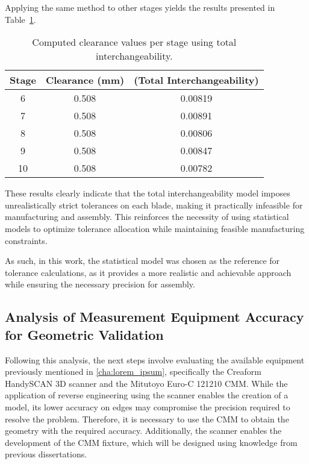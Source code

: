 Applying the same method to other stages yields the results presented in Table~\ref{tab:clearance_interchangeability}.

\begin{table}[h]
    \centering
    \begin{tabular}{@{}ccc@{}}
        \toprule
        Stage & Clearance (mm) &  \newline (Total Interchangeability) \\
        \midrule
        6  & 0.508 & 0.00819    \\
        7  & 0.508 & 0.00891    \\
        8  & 0.508 & 0.00806    \\
        9  & 0.508 & 0.00847    \\
        10 & 0.508 & 0.00782    \\
        \bottomrule
    \end{tabular}
    \caption{Computed clearance values per stage using total interchangeability.}
    \label{tab:clearance_interchangeability}
\end{table}

These results clearly indicate that the total interchangeability model imposes unrealistically strict tolerances on each blade, making it practically infeasible for manufacturing and assembly. This reinforces the necessity of using statistical models to optimize tolerance allocation while maintaining feasible manufacturing constraints.

As such, in this work, the statistical model was chosen as the reference for tolerance calculations, as it provides a more realistic and achievable approach while ensuring the necessary precision for assembly.

\subsection{Analysis of Measurement Equipment Accuracy for Geometric Validation}
\label{subsec:equipment_validation}

Following this analysis, the next steps involve evaluating the available equipment previously mentioned in \ref{cha:lorem_ipsum}, specifically the Creaform HandySCAN 3D scanner and the Mitutoyo Euro-C 121210 \gls{CMM}. While the application of reverse engineering using the scanner enables the creation of a model, its lower accuracy on edges may compromise the precision required to resolve the problem. Therefore, it is necessary to use the CMM to obtain the geometry with the required accuracy. Additionally, the scanner enables the development of the CMM fixture, which will be designed using knowledge from previous dissertations.

